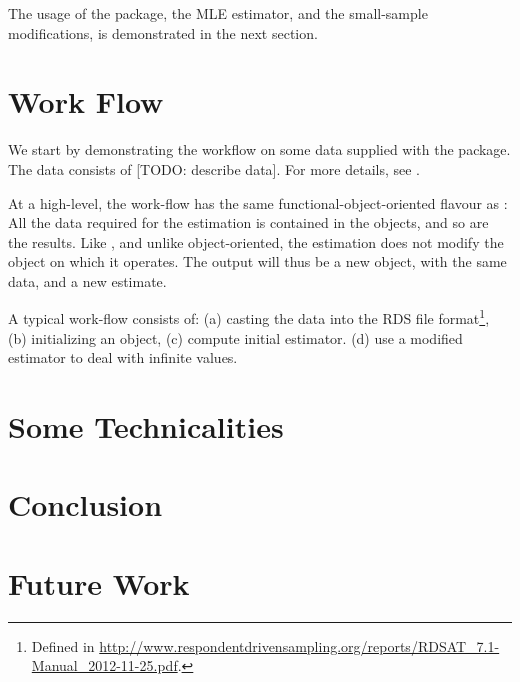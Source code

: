 \documentclass[article]{jss}
\begin{document}
The usage of the package, the MLE estimator, and the small-sample modifications, is demonstrated in the next section.



\section{Work Flow}

We start by demonstrating the workflow on some data supplied with the package. 
The data consists of [TODO: describe data].
For more details, see \citet{salganik_assessing_2011}. 

At a high-level, the work-flow has the same functional-object-oriented flavour as :
All the data required for the estimation is contained in the  objects, and so are the results. 
Like , and unlike object-oriented, the estimation does not modify the object on which it operates. The output will thus be a new object, with the same data, and a new estimate. 

A typical work-flow consists of:
(a) casting the data into the RDS file format\footnote{Defined in \url{http://www.respondentdrivensampling.org/reports/RDSAT_7.1-Manual_2012-11-25.pdf}.}, 
(b) initializing an  object, 
(c) compute initial estimator.
(d) use a modified estimator to deal with infinite values. 






\section{Some Technicalities}


\section{Conclusion}


\section{Future Work}




\end{document}
